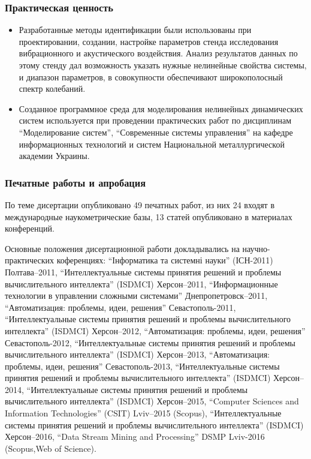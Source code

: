 \documentclass[10pt,utf8]{beamer}
\begin{document}

\begin{frame}
  \frametitle{Практическая ценность}

  \begin{itemize}

    \item
      Разработанные методы идентификации были использованы при проектировании,
      создании, настройке параметров стенда исследования вибрационного и
      акустического воздействия. Анализ результатов данных по этому стенду дал
      возможность указать нужные нелинейные свойства системы, и диапазон параметров,
      в совокупности обеспечивают широкополосный спектр колебаний.

    \item
      Созданное программное среда для моделирования нелинейных динамических систем
      используется при проведении практических работ по дисциплинам
      ``Моделирование систем'', ``Современные системы управления''
      на кафедре информационных технологий
      и систем Национальной металлургической академии Украины.

  \end{itemize}


\end{frame}




\begin{frame}
  \frametitle{Печатные работы и апробация}

{\scriptsize
По теме дисертации опубликовано
49 печатных работ,
из них
24 входят в международные наукометрические базы,
13 статей опубликовано в материалах конференций.

Основные положения дисертационной работи докладывались на
научно-практических коференциях:
``Інформатика та системні науки'' (ІСН-2011) Полтава--2011,
``Интеллектуальные системы принятия решений и проблемы вычислительного интеллекта'' (ISDMCI) Херсон--2011,
``Информационные технологии в управлении сложными системами'' Днепропетровск--2011,
``Автоматизация: проблемы, идеи, решения'' Севастополь-2011,
``Интеллектуальные системы принятия решений и проблемы вычислительного интеллекта'' (ISDMCI) Херсон--2012,
``Автоматизация: проблемы, идеи, решения'' Севастополь-2012,
``Интеллектуальные системы принятия решений и проблемы вычислительного интеллекта'' (ISDMCI) Херсон--2013,
``Автоматизация: проблемы, идеи, решения'' Севастополь-2013,
``Интеллектуальные системы принятия решений и проблемы вычислительного интеллекта'' (ISDMCI) Херсон--2014,
``Интеллектуальные системы принятия решений и проблемы вычислительного интеллекта'' (ISDMCI) Херсон--2015,
``Computer Sciences and Information Technologies'' (CSIT) Lviv--2015 (Scopus),
``Интеллектуальные системы принятия решений и проблемы вычислительного интеллекта'' (ISDMCI) Херсон--2016,
``Data Stream Mining and Processing'' DSMP Lviv-2016 (Scopus,Web of Science).
}

\end{frame}
\end{document}
